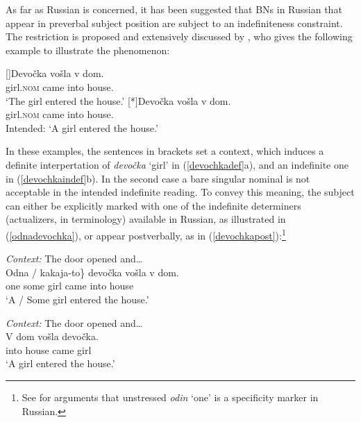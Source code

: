 \documentclass[output=paper,colorlinks,citecolor=brown]{langscibook}
\begin{document}
As far as Russian is concerned,  it has been suggested that BNs in Russian that appear in preverbal subject position are subject to an indefiniteness constraint. The restriction is proposed and extensively discussed by \citet{geist10}, who gives the following example to illustrate the phenomenon:


\ea
\begin{xlist}
\exi{}[]{\gll Devo\v{c}ka vo\v{s}la  v  dom.\\
girl.\textsc{nom}    came into  house.	 \\
\glt `The girl entered the house.'}
\exi{}[*]{\gll Devo\v{c}ka vo\v{s}la v dom. \\
girl.\textsc{nom}    came into house.\\
\glt Intended: `A girl entered the house.'\hfill \citep[193, ex. (5)]{geist10}}
\end{xlist}
\z

\noindent In these examples, the sentences in brackets set a context, which induces a definite interpertation of \textit{devo\v{c}ka} `girl' in (\ref{devochkadef}a), and an indefinite one in (\ref{devochkaindef}b). In the second case a bare singular nominal is not acceptable in the intended indefinite reading. To convey this meaning, the subject can either be explicitly marked with one of the indefinite determiners (actualizers, in  terminology) available in Russian, as illustrated in (\ref{odnadevochka}), or appear postverbally, as in (\ref{devochkapost}):\footnote{See \citet{Ionin2013} for arguments that unstressed \textit{odin} `one' is a specificity marker in Russian.} 

\ea \label{odnadevochka}
\textit{Context:} The {door opened} and\dots\\
{\gll \minsp{\{} Odna / kakaja-to\} devo\v{c}ka vo\v{s}la v dom.  \\
{} one {} some girl came into house \\
\glt `A / Some girl entered the house.'}
\z

\ea \label{devochkapost} \textit{Context:} The door opened and\dots\\
{\gll V dom vo\v{s}la devo\v{c}ka. \\
into house came girl \\
\glt `A girl entered the house.'\hfill \citep[193, ex. (6)]{geist10}}
\z
\end{document}
